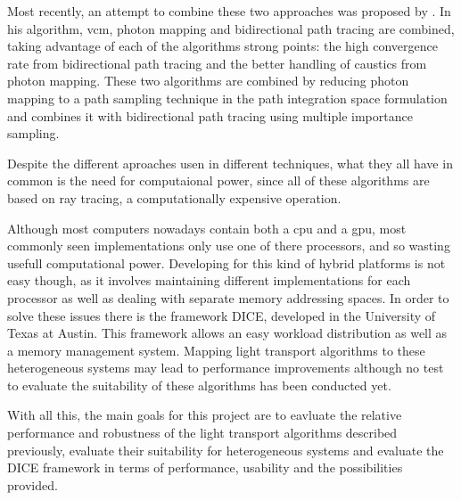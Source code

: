 Most recently, an attempt to combine these two approaches was proposed by \cite{Georgiev}. In his algorithm, \gls{vcm}, photon mapping and bidirectional path tracing are combined, taking advantage of each of the algorithms strong points: the high convergence rate from bidirectional path tracing and the better handling of caustics from photon mapping. These two algorithms are combined by reducing photon mapping to a path sampling technique in the path integration space formulation and combines it with bidirectional path tracing using multiple importance sampling.

Despite the different aproaches usen in different techniques, what they all have in common is the need for computaional power, since all of these algorithms are based on ray tracing, a computationally expensive operation.

Although most computers nowadays contain both a \gls{cpu} and a \gls{gpu}, most commonly seen implementations only use one of there processors, and so wasting usefull computational power. Developing for this kind of hybrid platforms is not easy though, as it involves maintaining different implementations for each processor as well as dealing with separate memory addressing spaces. In order to solve these issues there is the framework DICE, developed in the University of Texas at Austin. This framework allows an easy workload distribution as well as a memory management system. Mapping light transport algorithms to these heterogeneous systems may lead to performance improvements although no test to evaluate the suitability of these algorithms has been conducted yet. 

With all this, the main goals for this project are to eavluate the relative performance and robustness of the light transport algorithms described previously, evaluate their suitability for heterogeneous systems and evaluate the DICE framework in terms of performance, usability and the possibilities provided.